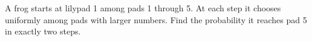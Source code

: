 A frog starts at lilypad 1 among pads 1 through 5. At each step it chooses uniformly among pads with larger numbers. Find the probability it reaches pad 5 in exactly two steps.
